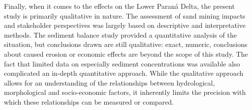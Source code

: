 Finally, when it comes to the effects on the Lower Paraná Delta, the present study is primarily qualitative in nature. The assessment of sand mining impacts and stakeholder perspectives was largely based on descriptive and interpretative methods. The sediment balance study provided a quantitative analysis of the situation, but conclusions drawn are still qualitative: exact, numeric, conclusions about caused erosion or economic effects are beyond the scope of this study. The fact that limited data on especially sediment concentrations was available also complicated an in-depth quantitative approach. While the qualitative approach allows for an understanding of the relationships between hydrological, morphological and socio-economic factors, it inherently limits the precision with which these relationships can be measured or compared.





